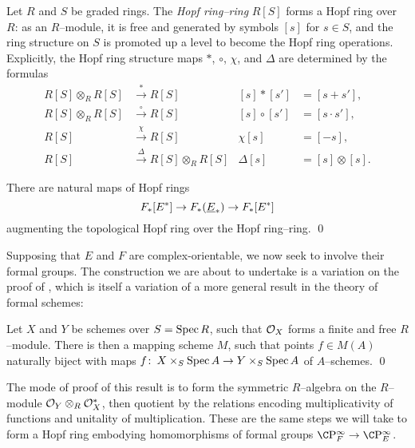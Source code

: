 \begin{definition}
Let \(R\) and \(S\) be graded rings.  The \textit{Hopf ring--ring} \(R[S]\) forms a Hopf ring over \(R\): as an \(R\)--module, it is free and generated by symbols \([s]\) for \(s \in S\), and the ring structure on \(S\) is promoted up a level to become the Hopf ring operations.  Explicitly, the Hopf ring structure maps \(\ast\), \(\circ\), \(\chi\), and \(\Delta\) are determined by the formulas
\begin{align*}
R[S] \otimes_R R[S] & \xrightarrow{\ast} R[S] & [s] \ast [s'] & = [s + s'], \\
R[S] \otimes_R R[S] & \xrightarrow{\circ} R[S] & [s] \circ [s'] & = [s \cdot s'], \\
R[S] & \xrightarrow{\chi} R[S] & \chi [s] & = [-s], \\
R[S] & \xrightarrow{\Delta} R[S] \otimes_R R[S] & \Delta [s] & = [s] \otimes [s].
\end{align*}
\end{definition}

\begin{lemma}
There are natural maps of Hopf rings \[F_*[E^*] \to F_*(\underline{\smash{E}}_{*}) \to F_*[E^*]\] augmenting the topological Hopf ring over the Hopf ring--ring. \qed
\end{lemma}

Supposing that \(E\) and \(F\) are complex-orientable, we now seek to involve their formal groups.  The construction we are about to undertake is a variation on the proof of , which is itself a variation of a more general result in the theory of formal schemes:
\begin{lemma}\label{MappingSchemeStatement}
Let \(X\) and \(Y\) be schemes over \(S = \operatorname{Spec} R\), such that \(\mathcal{O}_X\) forms a finite and free \(R\)--module.  There is then a mapping scheme \(M\), such that points \(f \in M(A)\) naturally biject with maps \(f\colon\thinspace X \times_S \operatorname{Spec} A \to Y \times_S \operatorname{Spec} A\) of \(A\)--schemes. \qed
\end{lemma}

\noindent The mode of proof of this result is to form the symmetric \(R\)--algebra on the \(R\)--module \(\mathcal{O}_Y \otimes_R \mathcal{O}_X^*\), then quotient by the relations encoding multiplicativity of functions and unitality of multiplication.  These are the same steps we will take to form a Hopf ring embodying homomorphisms of formal groups \(\CP^\infty_F \to \CP^\infty_E\).

